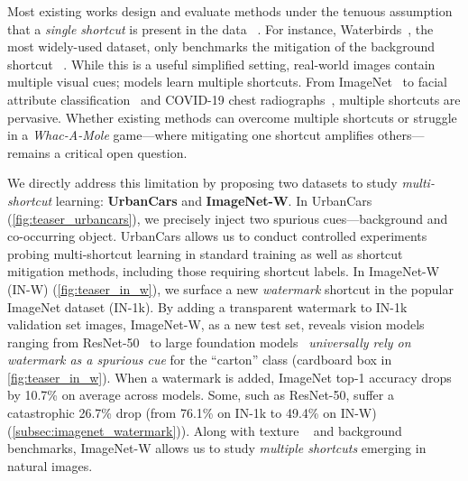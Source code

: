 \documentclass[10pt,twocolumn,letterpaper]{article}
\begin{document}
Most existing works design and evaluate methods
under the tenuous assumption that a \emph{single shortcut} is present in the data
~\cite{sagawa2020Int.Conf.Learn.Represent.Distributionally,nam2020Adv.NeuralInf.Process.Syst.Learning,he2021PatternRecognitionNonI}.
For instance, Waterbirds~\cite{sagawa2020Int.Conf.Learn.Represent.Distributionally}, the most widely-used dataset, only benchmarks the mitigation of the background shortcut
~\cite{liu2021Int.Conf.Mach.Learn.Just,creager2021Int.Conf.Mach.Learn.Environment,bao2022Int.Conf.Mach.Learn.Learning}.
While this is a useful simplified setting,
real-world images contain multiple visual cues;
models learn multiple shortcuts.
From ImageNet~\cite{singla2022Int.Conf.Learn.Represent.Salient,deng2009IEEEConf.Comput.Vis.PatternRecognit.CVPRImageNet} to facial attribute classification~\cite{lang2021IEEECVFInt.Conf.Comput.Vis.ICCVExplaining} and COVID-19 chest radiographs~\cite{degrave2021NatMachIntellAI},
multiple shortcuts are pervasive.
Whether existing methods can overcome multiple shortcuts or struggle in a \emph{Whac-A-Mole} game---where mitigating one shortcut amplifies others---remains a critical open question.

We directly address this limitation by proposing two datasets to study \emph{multi-shortcut} learning:
\textbf{UrbanCars}
and \textbf{ImageNet-W}.
In UrbanCars (\cref{fig:teaser_urbancars}), we precisely inject two spurious cues---background and co-occurring object.
UrbanCars allows us to conduct controlled experiments probing multi-shortcut learning in standard training as well as shortcut mitigation methods, including those requiring shortcut labels.
In ImageNet-W (IN-W) (\cref{fig:teaser_in_w}), we surface a new \emph{watermark} shortcut in the popular ImageNet dataset (IN-1k).
By adding a transparent watermark to IN-1k validation set images, ImageNet-W, as a new test set, reveals vision models ranging from ResNet-50~\cite{he2016IEEEConf.Comput.Vis.PatternRecognit.CVPRDeep} to large foundation models~\cite{bommasani2022Opportunities} \emph{universally rely on watermark as a spurious cue} for the ``carton'' class (\cf cardboard box in \cref{fig:teaser_in_w}).
When a watermark is added, ImageNet top-1 accuracy drops by 10.7\% on average across models. Some, such as ResNet-50, suffer a catastrophic 26.7\% drop (from 76.1\% on IN-1k to 49.4\% on IN-W) (\cref{subsec:imagenet_watermark})).
Along with texture ~\cite{geirhos2019Int.Conf.Learn.Represent.ImageNettrained,hendrycks2021IEEECVFInt.Conf.Comput.Vis.ICCVMany} and background~\cite{xiao2021Int.Conf.Learn.Represent.Noise} benchmarks, ImageNet-W allows us to study \emph{multiple shortcuts} emerging in natural images.
\end{document}
